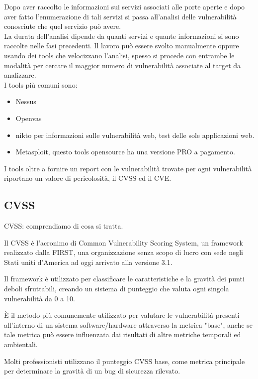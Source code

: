 \documentclass[a4paper,12pt]{article}
\begin{document}
Dopo aver raccolto le informazioni sui servizi associati alle porte aperte e dopo aver fatto l'enumerazione di tali servizi si passa all'analisi delle vulnerabilità conosciute che quel servizio può avere.\\
La durata dell'analisi dipende da quanti servizi e quante informazioni si sono raccolte nelle fasi precedenti.
Il lavoro può essere svolto manualmente oppure usando dei tools che velocizzano l'analisi, spesso si procede con entrambe le modalità per cercare il maggior numero di vulnerabilità associate al target da analizzare. \\
I tools più comuni sono:
\begin{itemize}
   
  \item Nessus\cite{nessus}
  \item Openvas \cite{openvas}
  \item nikto\cite{nikto} per informazioni sulle vulnerabilità web, test delle sole applicazioni web.
  \item Metasploit\cite{metasploit}, questo tools opensource ha una versione PRO a pagamento.
\end{itemize}

I tools oltre a fornire un report con le vulnerabilità trovate per ogni vulnerabilità riportano un valore di pericolosità, il CVSS ed il CVE.

\subsection{CVSS}

CVSS: comprendiamo di cosa si tratta.

Il CVSS\cite{CVSS} è l’acronimo di Common Vulnerability Scoring System, un framework realizzato dalla FIRST\cite{First}, una organizzazione senza scopo di lucro con sede negli Stati uniti d’America ad oggi arrivato alla versione 3.1.

Il framework è utilizzato per classificare le caratteristiche e la gravità dei punti deboli sfruttabili, creando un sistema di punteggio che valuta ogni singola vulnerabilità da 0 a 10.

È il metodo più comunemente utilizzato per valutare le vulnerabilità presenti all'interno di un sistema software/hardware attraverso la metrica "base", anche se tale metrica può essere influenzata dai risultati di altre metriche temporali ed ambientali.

Molti professionisti utilizzano il punteggio CVSS base, come metrica principale per determinare la gravità di un bug di sicurezza rilevato. 
\end{document}
